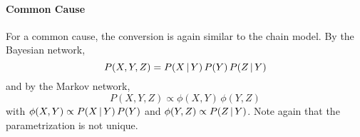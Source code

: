		\paragraph{Common Cause}
			\begin{center}
			\end{center}
			For a common cause, the conversion is again similar to the chain model. By the Bayesian network,
			\begin{equation}
				P(X, Y, Z) = P(X \,\vert\, Y) \, P(Y) \, P(Z \,\vert\, Y)
			\end{equation}
			and by the Markov network,
			\begin{equation}
				P(X, Y, Z) \propto \phi(X, Y) \, \phi(Y, Z)
			\end{equation}
			with \( \phi(X, Y) \propto P(X \,\vert\, Y) \, P(Y) \) and \( \phi(Y, Z) \propto P(Z \,\vert\, Y) \). Note again that the parametrization is not unique.

